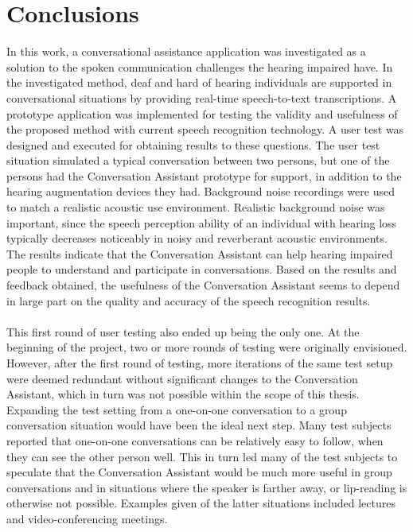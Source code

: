 \documentclass[english, 12pt, a4paper, pdftex, elec, utf8]{aaltothesis}
\begin{document}
\section{Conclusions} \label{sec:loppu}

In this work, a conversational assistance application was investigated as a solution to the spoken communication challenges the hearing impaired have. In the investigated method, deaf and hard of hearing individuals are supported in conversational situations by providing real-time speech-to-text transcriptions. A prototype application was implemented for testing the validity and usefulness of the proposed method with current speech recognition technology. A user test was designed and executed for obtaining results to these questions. The user test situation simulated a typical conversation between two persons, but one of the persons had the Conversation Assistant prototype for support, in addition to the hearing augmentation devices they had. Background noise recordings were used to match a realistic acoustic use environment. Realistic background noise was important, since the speech perception ability of an individual with hearing loss typically decreases noticeably in noisy and reverberant acoustic environments. The results indicate that the Conversation Assistant can help hearing impaired people to understand and participate in conversations. Based on the results and feedback obtained, the usefulness of the Conversation Assistant seems to depend in large part on the quality and accuracy of the speech recognition results. \\\\
This first round of user testing also ended up being the only one. At the beginning of the project, two or more rounds of testing were originally envisioned. However, after the first round of testing, more iterations of the same test setup were deemed redundant without significant changes to the Conversation Assistant, which in turn was not possible within the scope of this thesis. Expanding the test setting from a one-on-one conversation to a group conversation situation would have been the ideal next step. Many test subjects reported that one-on-one conversations can be relatively easy to follow, when they can see the other person well. This in turn led many of the test subjects to speculate that the Conversation Assistant would be much more useful in group conversations and in situations where the speaker is farther away, or lip-reading is otherwise not possible. Examples given of the latter situations included lectures and video-conferencing meetings. \\\\
\end{document}
